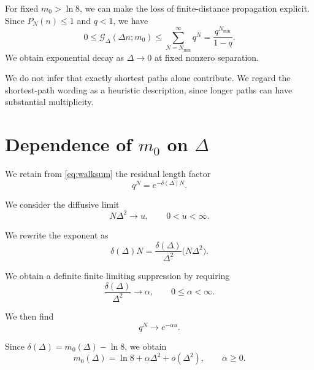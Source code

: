 \documentclass[11pt,a4paper]{article}
\numberwithin{equation}{section}
\begin{document}
For fixed $m_0>\ln8$, we can make the loss of
finite-distance propagation explicit. Since
$P_N(n)\leq1$ and $q<1$, we have
\begin{equation}
    0\leq\mathcal G_\Delta(\Delta n;m_0)
    \leq
    \sum_{N=N_{\min}}^\infty q^N
    =
    \frac{q^{N_{\min}}}{1-q}.
\end{equation}
We obtain exponential decay as $\Delta\to0$ at
fixed nonzero separation.

We do not infer that exactly shortest paths alone
contribute. We regard the shortest-path wording
as a heuristic description, since longer paths
can have substantial multiplicity.

\section{Dependence of $m_0$ on $\Delta$}

We retain from \eqref{eq:walksum} the residual
length factor
\begin{equation}
    q^N=e^{-\delta(\Delta)N}.
    \label{eq:residual}
\end{equation}

We consider the diffusive limit
\begin{equation}
    N\Delta^2\longrightarrow u,
    \qquad 0<u<\infty.
    \label{eq:u}
\end{equation}

We rewrite the exponent as
\begin{equation}
    \delta(\Delta)N
    =
    \frac{\delta(\Delta)}{\Delta^2}
    \bigl(N\Delta^2\bigr).
    \label{eq:exponent}
\end{equation}

We obtain a definite finite limiting suppression
by requiring
\begin{equation}
    \frac{\delta(\Delta)}{\Delta^2}
    \longrightarrow\alpha,
    \qquad 0\leq\alpha<\infty.
    \label{eq:alpha}
\end{equation}

We then find
\begin{equation}
    q^N\longrightarrow e^{-\alpha u}.
    \label{eq:finiteweight}
\end{equation}

Since $\delta(\Delta)=m_0(\Delta)-\ln8$, we obtain
\begin{equation}
    \boxed{
    m_0(\Delta)
    =
    \ln8+\alpha\Delta^2+o(\Delta^2),
    \qquad \alpha\geq0.
    }
    \label{eq:main}
\end{equation}
\end{document}

